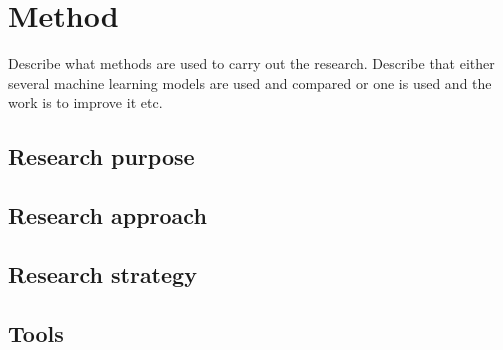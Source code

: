 \chapter{Method}
Describe what methods are used to carry out the research. Describe that either several machine learning models are used and compared or one is used and the work is to improve it etc.


\section{Research purpose}
\section{Research approach}
\section{Research strategy}


\section{Tools}



